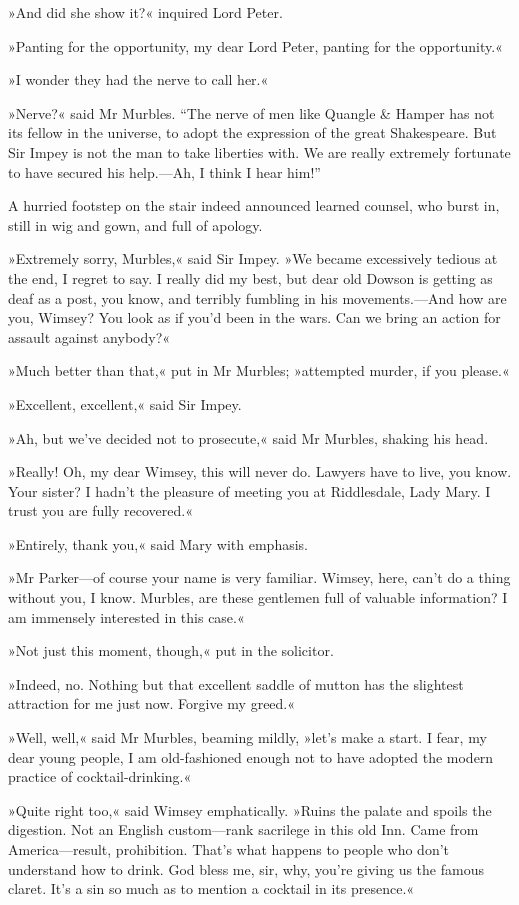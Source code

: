 »And did she show it?« inquired Lord Peter.

»Panting for the opportunity, my dear Lord Peter, panting for the opportunity.«

»I wonder they had the nerve to call her.«

»Nerve?« said Mr Murbles. \enquote{The nerve of men like Quangle \& Hamper has not its fellow in the universe, to adopt the expression of the great Shakespeare. But Sir Impey is not the man to take liberties with. We are really extremely fortunate to have secured his help.---Ah, I think I hear him!}

A hurried footstep on the stair indeed announced learned counsel, who burst in, still in wig and gown, and full of apology.

»Extremely sorry, Murbles,« said Sir Impey. »We became excessively tedious at the end, I regret to say. I really did my best, but dear old Dowson is getting as deaf as a post, you know, and terribly fumbling in his movements.---And how are you, Wimsey? You look as if you'd been in the wars. Can we bring an action for assault against anybody?«

»Much better than that,« put in Mr Murbles; »attempted murder, if you please.«

»Excellent, excellent,« said Sir Impey.

»Ah, but we've decided not to prosecute,« said Mr Murbles, shaking his head.

»Really! Oh, my dear Wimsey, this will never do. Lawyers have to live, you know. Your sister? I hadn't the pleasure of meeting you at Riddlesdale, Lady Mary. I trust you are fully recovered.«

»Entirely, thank you,« said Mary with emphasis.

»Mr Parker\allowbreak---\allowbreak of course your name is very familiar. Wimsey, here, can't do a thing without you, I know. Murbles, are these gentlemen full of valuable information? I am immensely interested in this case.«

»Not just this moment, though,« put in the solicitor.

»Indeed, no. Nothing but that excellent saddle of mutton has the slightest attraction for me just now. Forgive my greed.«

»Well, well,« said Mr Murbles, beaming mildly, »let's make a start.  I fear, my dear young people, I am old-fashioned enough not to have adopted the modern practice of cocktail-drinking.«

»Quite right too,« said Wimsey emphatically. »Ruins the palate and spoils the digestion. Not an English custom\allowbreak---\allowbreak rank sacrilege in this old Inn. Came from America\allowbreak---\allowbreak result, prohibition. That's what happens to people who don't understand how to drink. God bless me, sir, why, you're giving us the famous claret. It's a sin so much as to mention a cocktail in its presence.«

